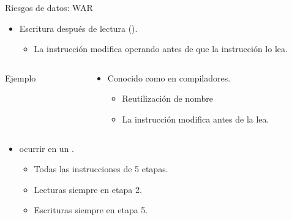 \begin{frame}[t,fragile]{Riesgos de datos: WAR}
\begin{itemize}
  \item Escritura después de lectura ().
    \begin{itemize}
      \item La instrucción  modifica operando antes de que la
            instrucción  lo lea.
    \end{itemize}
\end{itemize}
\begin{columns}
\begin{column}{.25\textwidth}
\begin{block}{Ejemplo}

\end{block}
\end{column}
\begin{column}{.75\textwidth}
\begin{itemize}
  \item Conocido como  en compiladores.
    \begin{itemize}
      \item Reutilización de nombre
      \item La instrucción  modifica 
            antes de  la lea.
    \end{itemize}
\end{itemize}
\end{column}
\end{columns}
\begin{itemize}
  \item {} ocurrir en un .
  \begin{itemize}
    \item Todas las instrucciones de 5 etapas.
    \item Lecturas siempre en etapa 2.
    \item Escrituras siempre en etapa 5.
  \end{itemize}
\end{itemize}
\end{frame}

